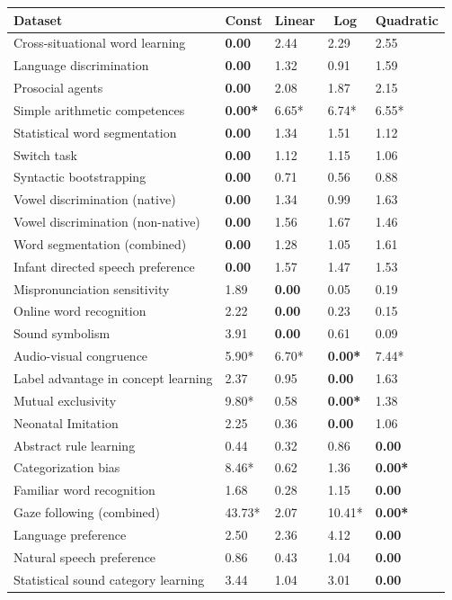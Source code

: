 \documentclass[
  man]{apa6}
\begin{document}
\begin{table}[hbt]
\begin{center}
\begin{threeparttable}
\begin{tabular}{lllll}
\toprule
Dataset & \multicolumn{1}{c}{Const} & \multicolumn{1}{c}{Linear} & \multicolumn{1}{c}{Log} & \multicolumn{1}{c}{Quadratic}\\
\midrule
Cross-situational word learning & \bf{0.00} & 2.44 & 2.29 & 2.55\\
Language discrimination & \bf{0.00} & 1.32 & 0.91 & 1.59\\
Prosocial agents & \bf{0.00} & 2.08 & 1.87 & 2.15\\
Simple arithmetic competences & \bf{0.00*} & 6.65* & 6.74* & 6.55*\\
Statistical word segmentation & \bf{0.00} & 1.34 & 1.51 & 1.12\\
Switch task & \bf{0.00} & 1.12 & 1.15 & 1.06\\
Syntactic bootstrapping & \bf{0.00} & 0.71 & 0.56 & 0.88\\
Vowel discrimination (native) & \bf{0.00} & 1.34 & 0.99 & 1.63\\
Vowel discrimination (non-native) & \bf{0.00} & 1.56 & 1.67 & 1.46\\
Word segmentation (combined) & \bf{0.00} & 1.28 & 1.05 & 1.61\\
Infant directed speech preference & \bf{0.00} & 1.57 & 1.47 & 1.53\\
Mispronunciation sensitivity & 1.89 & \bf{0.00} & 0.05 & 0.19\\
Online word recognition & 2.22 & \bf{0.00} & 0.23 & 0.15\\
Sound symbolism & 3.91 & \bf{0.00} & 0.61 & 0.09\\
Audio-visual congruence & 5.90* & 6.70* & \bf{0.00*} & 7.44*\\
Label advantage in concept learning & 2.37 & 0.95 & \bf{0.00} & 1.63\\
Mutual exclusivity & 9.80* & 0.58 & \bf{0.00*} & 1.38\\
Neonatal Imitation & 2.25 & 0.36 & \bf{0.00} & 1.06\\
Abstract rule learning & 0.44 & 0.32 & 0.86 & \bf{0.00}\\
Categorization bias & 8.46* & 0.62 & 1.36 & \bf{0.00*}\\
Familiar word recognition & 1.68 & 0.28 & 1.15 & \bf{0.00}\\
Gaze following (combined) & 43.73* & 2.07 & 10.41* & \bf{0.00*}\\
Language preference & 2.50 & 2.36 & 4.12 & \bf{0.00}\\
Natural speech preference & 0.86 & 0.43 & 1.04 & \bf{0.00}\\
Statistical sound category learning & 3.44 & 1.04 & 3.01 & \bf{0.00}\\
\bottomrule
\end{tabular}

\end{threeparttable}
\end{center}

\end{table}
\efloatseparator
\end{document}
